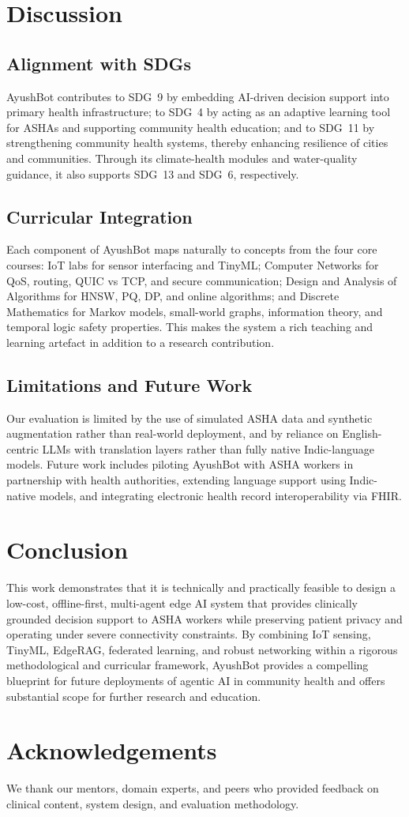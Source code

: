\documentclass[conference]{IEEEtran}
\begin{document}
\section{Discussion}

\subsection{Alignment with SDGs}
AyushBot contributes to SDG~9 by embedding AI-driven decision support into primary health infrastructure; to SDG~4 by acting as an adaptive learning tool for ASHAs and supporting community health education; and to SDG~11 by strengthening community health systems, thereby enhancing resilience of cities and communities. Through its climate-health modules and water-quality guidance, it also supports SDG~13 and SDG~6, respectively.

\subsection{Curricular Integration}
Each component of AyushBot maps naturally to concepts from the four core courses: IoT labs for sensor interfacing and TinyML; Computer Networks for QoS, routing, QUIC vs TCP, and secure communication; Design and Analysis of Algorithms for HNSW, PQ, DP, and online algorithms; and Discrete Mathematics for Markov models, small-world graphs, information theory, and temporal logic safety properties. This makes the system a rich teaching and learning artefact in addition to a research contribution.

\subsection{Limitations and Future Work}
Our evaluation is limited by the use of simulated ASHA data and synthetic augmentation rather than real-world deployment, and by reliance on English-centric LLMs with translation layers rather than fully native Indic-language models. Future work includes piloting AyushBot with ASHA workers in partnership with health authorities, extending language support using Indic-native models, and integrating electronic health record interoperability via FHIR.

\section{Conclusion}

This work demonstrates that it is technically and practically feasible to design a low-cost, offline-first, multi-agent edge AI system that provides clinically grounded decision support to ASHA workers while preserving patient privacy and operating under severe connectivity constraints. By combining IoT sensing, TinyML, EdgeRAG, federated learning, and robust networking within a rigorous methodological and curricular framework, AyushBot provides a compelling blueprint for future deployments of agentic AI in community health and offers substantial scope for further research and education.

\section*{Acknowledgements}
We thank our mentors, domain experts, and peers who provided feedback on clinical content, system design, and evaluation methodology.



\end{document}
